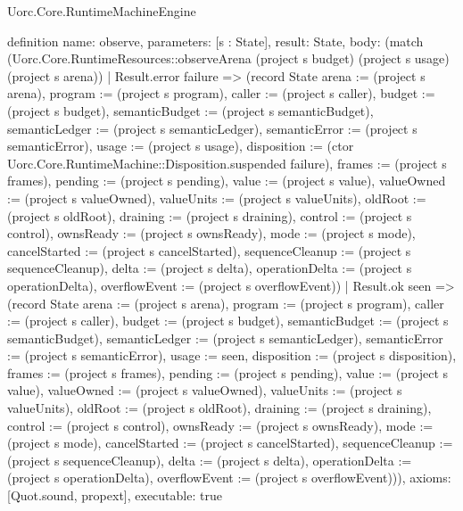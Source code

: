 \begin{lexlean}{Uorc.Core.RuntimeMachineEngine}
\begin{semanticmodule}
definition{
  name: observe,
  parameters: [s : State],
  result: State,
  body: (match (Uorc.Core.RuntimeResources::observeArena (project s budget) (project s usage) (project s arena))
    | Result.error failure => (record State {arena := (project s arena), program := (project s program), caller := (project s caller), budget := (project s budget), semanticBudget := (project s semanticBudget), semanticLedger := (project s semanticLedger), semanticError := (project s semanticError), usage := (project s usage), disposition := (ctor Uorc.Core.RuntimeMachine::Disposition.suspended failure), frames := (project s frames), pending := (project s pending), value := (project s value), valueOwned := (project s valueOwned), valueUnits := (project s valueUnits), oldRoot := (project s oldRoot), draining := (project s draining), control := (project s control), ownsReady := (project s ownsReady), mode := (project s mode), cancelStarted := (project s cancelStarted), sequenceCleanup := (project s sequenceCleanup), delta := (project s delta), operationDelta := (project s operationDelta), overflowEvent := (project s overflowEvent)})
    | Result.ok seen => (record State {arena := (project s arena), program := (project s program), caller := (project s caller), budget := (project s budget), semanticBudget := (project s semanticBudget), semanticLedger := (project s semanticLedger), semanticError := (project s semanticError), usage := seen, disposition := (project s disposition), frames := (project s frames), pending := (project s pending), value := (project s value), valueOwned := (project s valueOwned), valueUnits := (project s valueUnits), oldRoot := (project s oldRoot), draining := (project s draining), control := (project s control), ownsReady := (project s ownsReady), mode := (project s mode), cancelStarted := (project s cancelStarted), sequenceCleanup := (project s sequenceCleanup), delta := (project s delta), operationDelta := (project s operationDelta), overflowEvent := (project s overflowEvent)})),
  axioms: [Quot.sound, propext],
  executable: true
}


\end{semanticmodule}
\end{lexlean}
